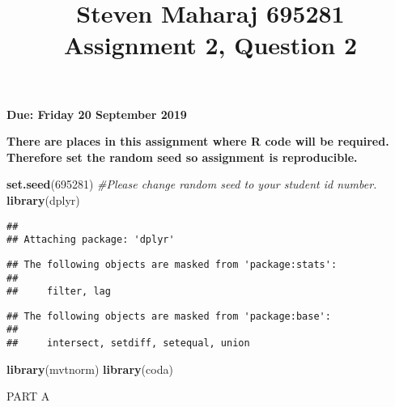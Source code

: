 \documentclass[]{article}
\title{Steven Maharaj 695281 Assignment 2, Question 2}
\author{}
\date{}
\newenvironment{Shaded}{\begin{snugshade}}{\end{snugshade}}
\newcommand{\KeywordTok}[1]{\textcolor[rgb]{0.13,0.29,0.53}{\textbf{#1}}}
\newcommand{\DecValTok}[1]{\textcolor[rgb]{0.00,0.00,0.81}{#1}}
\newcommand{\StringTok}[1]{\textcolor[rgb]{0.31,0.60,0.02}{#1}}
\newcommand{\CommentTok}[1]{\textcolor[rgb]{0.56,0.35,0.01}{\textit{#1}}}
\newcommand{\OperatorTok}[1]{\textcolor[rgb]{0.81,0.36,0.00}{\textbf{#1}}}
\newcommand{\NormalTok}[1]{#1}
\begin{document}
\maketitle

\textbf{Due: Friday 20 September 2019}\\
\vspace{5 mm}

\textbf{There are places in this assignment where R code will be
required. Therefore set the random seed so assignment is reproducible.}

\begin{Shaded}
\begin{Highlighting}[]
\KeywordTok{set.seed}\NormalTok{(}\DecValTok{695281}\NormalTok{) }\CommentTok{#Please change random seed to your student id number.}
\KeywordTok{library}\NormalTok{(dplyr)}
\end{Highlighting}
\end{Shaded}

\begin{verbatim}
## 
## Attaching package: 'dplyr'
\end{verbatim}

\begin{verbatim}
## The following objects are masked from 'package:stats':
## 
##     filter, lag
\end{verbatim}

\begin{verbatim}
## The following objects are masked from 'package:base':
## 
##     intersect, setdiff, setequal, union
\end{verbatim}

\begin{Shaded}
\begin{Highlighting}[]
\KeywordTok{library}\NormalTok{(mvtnorm)}
\KeywordTok{library}\NormalTok{(coda)}
\end{Highlighting}
\end{Shaded}

PART A

\begin{Shaded}
\end{Shaded}
\end{document}
